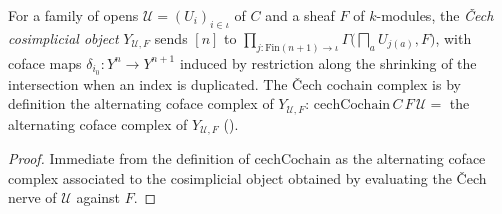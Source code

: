 \begin{definition}
  \label{def:adelic_cechCosimplicial}
  \leanok
  For a family of opens \(\mathcal{U} = (U_i)_{i \in \iota}\) of \(C\)
  and a sheaf \(F\) of \(k\)-modules, the \emph{Čech cosimplicial object}
  \(Y_{\mathcal{U}, F}\) sends \([n]\) to
  \(\prod_{j \colon \mathrm{Fin}(n+1) \to \iota} \Gamma\bigl(\bigsqcap_a
  U_{j(a)}, F\bigr)\), with coface maps \(\delta_{i_0} \colon Y^n \to
  Y^{n+1}\) induced by restriction along the shrinking of the
  intersection when an index is duplicated. The Čech cochain complex is
  by definition the alternating coface complex of \(Y_{\mathcal{U},
  F}\):
  \(\mathrm{cechCochain}\, C\, F\, \mathcal{U} =\) the alternating coface
  complex of \(Y_{\mathcal{U}, F}\)
  ().
\end{definition}
\begin{proof}
  \leanok
  Immediate from the definition of \(\mathrm{cechCochain}\) as the
  alternating coface complex associated to the cosimplicial object
  obtained by evaluating the Čech nerve of \(\mathcal{U}\) against \(F\).
\end{proof}

